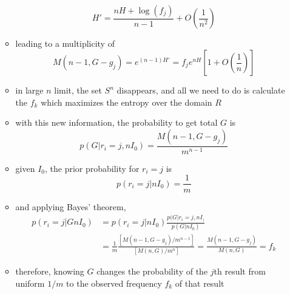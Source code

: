 \documentclass[../jaynes_prob_theory_notes.tex]{subfiles}
\begin{document}
\begin{itemize}
\begin{itemize}
\begin{equation*}
                                        H' = \frac{nH + \log (f_j)}{n-1} + O \left( \frac{1}{n^2} \right)
                                    \end{equation*}
                                \item leading to a multiplicity of 
                                    \begin{equation*}
                                        M(n-1, G-g_j) = e^{(n-1)H'} = f_j e^{nH} \left[1 + O \left( \frac{1}{n} \right) \right]
                                    \end{equation*}
                                \item in large $n$ limit, the set $S^n$ disappears, and all we need to do is calculate the $f_k$ which maximizes the entropy over the domain $R$
                                \item with this new information, the probability to get total $G$ is 
                                    \begin{equation*}
                                        p(G|r_i = j, nI_0) = \frac{M(n-1, G-g_j)}{m^{n-1}}
                                    \end{equation*}
                                \item given $I_0$, the prior probability for $r_i = j$ is 
                                    \begin{equation*}
                                        p(r_i = j|nI_0) = \frac{1}{m}
                                    \end{equation*}
                                \item and applying Bayes' theorem,
                                    \begin{equation*}
                                    \begin{split}
                                        p(r_i = j | GnI_0) &= p(r_i = j | nI_0) \frac{p(G|r_i = j, nI_)}{p(G|nI_0)} \\
                                                           &= \frac{1}{m} \frac{[M(n-1, G-g_j) / m^{n-1}]}{[M(n,G)/m^n]} = \frac{M(n-1, G-g_j)}{M(n,G)} = f_k
                                    \end{split}
                                    \end{equation*}
                                \item therefore, knowing $G$ changes the probability of the $j$th result from uniform $1/m$ to the observed frequency $f_k$ of that result
                            \end{itemize}
                    \end{itemize}
\end{document}
